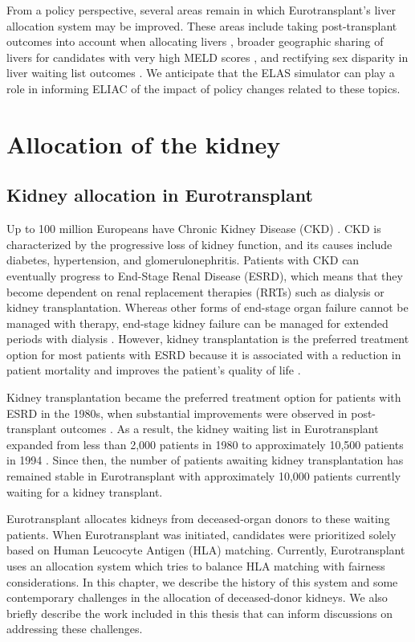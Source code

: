 \documentclass[11pt,twoside,]{book}
\begin{document}
From a policy perspective, several areas remain in which
Eurotransplant's liver allocation system may be improved. These areas
include taking post-transplant outcomes into account when allocating
livers \citep{Allen2024}, broader geographic sharing of livers for candidates
with very high MELD scores
\citep{massieEarlyChangesLiver2015, Ravaioli2022}, and
rectifying sex disparity in liver waiting list outcomes
\citep{deFerranteSexDisparityLiver2024}. We anticipate that the ELAS simulator can
play a role in informing ELIAC of the impact of policy changes
related to these topics.

\part{Allocation of the kidney}

\chapter{Kidney allocation in Eurotransplant}\label{CHprefacekidney}

Up to 100 million Europeans have Chronic Kidney Disease (CKD) \citep{Vanholder2021}.
CKD is characterized by the progressive loss of kidney function, and its causes
include diabetes, hypertension, and glomerulonephritis. Patients with CKD
can eventually progress to End-Stage Renal Disease (ESRD), which means that they
become dependent on renal replacement therapies (RRTs) such as dialysis or
kidney transplantation. Whereas other forms of end-stage organ failure cannot
be managed with therapy, end-stage kidney failure can be managed for extended
periods with dialysis \citep{HaaseKromwijk1999}.
However, kidney transplantation is the preferred treatment option for most
patients with ESRD because it is associated with a reduction in patient mortality
and improves the patient's quality of life \citep{Tonelli2011}.

Kidney transplantation became the preferred treatment option for patients with
ESRD in the 1980s, when substantial improvements were observed in post-transplant
outcomes \citep{HaaseKromwijk1999}. As a result, the kidney waiting list in Eurotransplant
expanded from less than 2,000 patients in 1980
to approximately 10,500 patients in 1994 \citep{eurotransplantAR2005}. Since then, the number of patients awaiting kidney transplantation has remained stable in
Eurotransplant with approximately 10,000 patients currently waiting for a kidney transplant.

Eurotransplant allocates kidneys from deceased-organ donors to these waiting patients.
When Eurotransplant was initiated, candidates were prioritized solely based
on Human Leucocyte Antigen (HLA) matching. Currently,
Eurotransplant uses an allocation system which tries to balance HLA matching
with fairness considerations. In this chapter, we describe the history of this
system and some contemporary challenges in the allocation of deceased-donor kidneys.
We also briefly describe the work included in this thesis that can inform
discussions on addressing these challenges.
\end{document}
